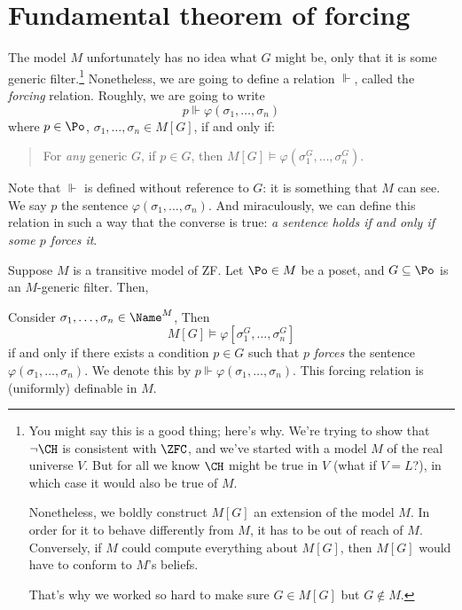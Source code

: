 \section{Fundamental theorem of forcing}
The model $M$ unfortunately has no idea what $G$ might be,
only that it is some generic filter.\footnote{You might
	say this is a good thing; here's why.
	We're trying to show that $\neg \CH$ is consistent with $\ZFC$,
	and we've started with a model $M$ of the real universe $V$.
	But for all we know $\CH$ might be true in $V$ (what if $V=L$?),
	in which case it would also be true of $M$.

	Nonetheless, we boldly construct $M[G]$ an extension of the model $M$.
	In order for it to behave differently from $M$, it has to be out of reach of $M$.
	Conversely, if $M$ could compute everything about $M[G]$,
	then $M[G]$ would have to conform to $M$'s beliefs.

	That's why we worked so hard to make sure $G \in M[G]$ but $G \notin M$.}
Nonetheless, we are going to define a relation $\Vdash$,
called the \emph{forcing} relation.
Roughly, we are going to write
\[ p \Vdash \varphi(\sigma_1, \dots, \sigma_n) \]
where $p \in \Po$, $\sigma_1, \dots, \sigma_n \in M[G]$, if and only if:
\begin{quote}
	For \emph{any} generic $G$,
	if $p \in G$,
	then $M[G] \vDash \varphi(\sigma_1^G, \dots, \sigma_n^G)$.
\end{quote}
Note that $\Vdash$ is defined without reference to $G$:
it is something that $M$ can see.
We say $p$  the sentence $\varphi(\sigma_1, \dots, \sigma_n)$.
And miraculously, we can define this relation in such a way that the converse is true:
\emph{a sentence holds if and only if some $p$ forces it}.


\begin{theorem}
	Suppose $M$ is a transitive model of ZF.
	Let $\Po \in M$ be a poset, and $G \subseteq \Po$ is an $M$-generic filter.
	Then,
	\begin{enumerate}[(1)]
		\ii Consider $\sigma_1, \dots, \sigma_n \in \Name^M$,
		Then
		\[ M[G] \vDash \varphi[\sigma_1^G, \dots, \sigma_n^G] \]
		if and only if there exists a condition $p \in G$
		such that $p$ \emph{forces} the sentence $\varphi(\sigma_1, \dots, \sigma_n)$.
		We denote this by $p \Vdash \varphi(\sigma_1, \dots, \sigma_n)$.
		\ii This forcing relation is (uniformly) definable in $M$.
	\end{enumerate}
\end{theorem}

